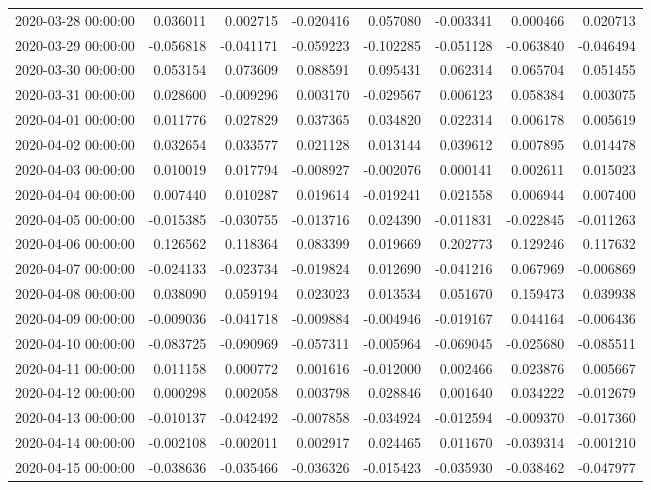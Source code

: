 \begin{tabular}{lrrrrrrr}
2020-03-28 00:00:00 & 0.036011 & 0.002715 & -0.020416 & 0.057080 & -0.003341 & 0.000466 & 0.020713 \\
2020-03-29 00:00:00 & -0.056818 & -0.041171 & -0.059223 & -0.102285 & -0.051128 & -0.063840 & -0.046494 \\
2020-03-30 00:00:00 & 0.053154 & 0.073609 & 0.088591 & 0.095431 & 0.062314 & 0.065704 & 0.051455 \\
2020-03-31 00:00:00 & 0.028600 & -0.009296 & 0.003170 & -0.029567 & 0.006123 & 0.058384 & 0.003075 \\
2020-04-01 00:00:00 & 0.011776 & 0.027829 & 0.037365 & 0.034820 & 0.022314 & 0.006178 & 0.005619 \\
2020-04-02 00:00:00 & 0.032654 & 0.033577 & 0.021128 & 0.013144 & 0.039612 & 0.007895 & 0.014478 \\
2020-04-03 00:00:00 & 0.010019 & 0.017794 & -0.008927 & -0.002076 & 0.000141 & 0.002611 & 0.015023 \\
2020-04-04 00:00:00 & 0.007440 & 0.010287 & 0.019614 & -0.019241 & 0.021558 & 0.006944 & 0.007400 \\
2020-04-05 00:00:00 & -0.015385 & -0.030755 & -0.013716 & 0.024390 & -0.011831 & -0.022845 & -0.011263 \\
2020-04-06 00:00:00 & 0.126562 & 0.118364 & 0.083399 & 0.019669 & 0.202773 & 0.129246 & 0.117632 \\
2020-04-07 00:00:00 & -0.024133 & -0.023734 & -0.019824 & 0.012690 & -0.041216 & 0.067969 & -0.006869 \\
2020-04-08 00:00:00 & 0.038090 & 0.059194 & 0.023023 & 0.013534 & 0.051670 & 0.159473 & 0.039938 \\
2020-04-09 00:00:00 & -0.009036 & -0.041718 & -0.009884 & -0.004946 & -0.019167 & 0.044164 & -0.006436 \\
2020-04-10 00:00:00 & -0.083725 & -0.090969 & -0.057311 & -0.005964 & -0.069045 & -0.025680 & -0.085511 \\
2020-04-11 00:00:00 & 0.011158 & 0.000772 & 0.001616 & -0.012000 & 0.002466 & 0.023876 & 0.005667 \\
2020-04-12 00:00:00 & 0.000298 & 0.002058 & 0.003798 & 0.028846 & 0.001640 & 0.034222 & -0.012679 \\
2020-04-13 00:00:00 & -0.010137 & -0.042492 & -0.007858 & -0.034924 & -0.012594 & -0.009370 & -0.017360 \\
2020-04-14 00:00:00 & -0.002108 & -0.002011 & 0.002917 & 0.024465 & 0.011670 & -0.039314 & -0.001210 \\
2020-04-15 00:00:00 & -0.038636 & -0.035466 & -0.036326 & -0.015423 & -0.035930 & -0.038462 & -0.047977 \\

\end{tabular}
